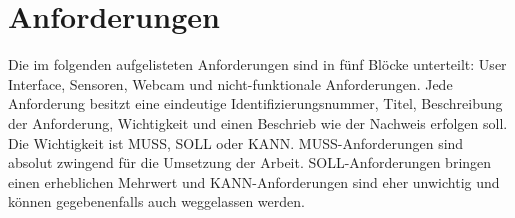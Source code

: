 \section{Anforderungen}
Die im folgenden aufgelisteten Anforderungen sind in fünf Blöcke unterteilt: User Interface, Sensoren, Webcam und nicht-funktionale Anforderungen.
Jede Anforderung besitzt eine eindeutige Identifizierungsnummer, Titel, Beschreibung der Anforderung, Wichtigkeit und einen Beschrieb wie der Nachweis erfolgen soll.
Die Wichtigkeit ist MUSS, SOLL oder KANN. MUSS-Anforderungen sind absolut zwingend für die Umsetzung der Arbeit. SOLL-Anforderungen bringen einen erheblichen Mehrwert und KANN-Anforderungen sind eher unwichtig und können gegebenenfalls auch weggelassen werden.

